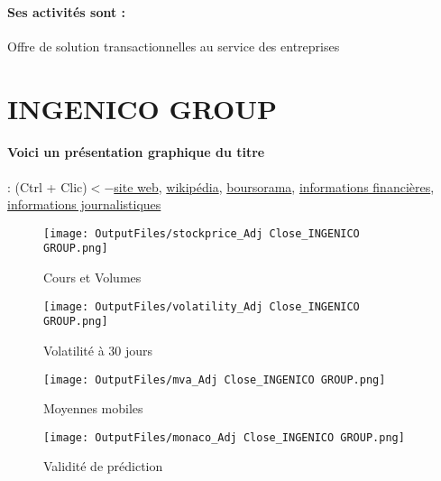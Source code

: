 \documentclass[11pt,a4paper]{report}%
\begin{document}
\paragraph{Ses activités sont : } Offre de solution transactionnelles au service des entreprises 
    
    \newpage

\section{INGENICO GROUP}

\paragraph{Voici un présentation graphique du titre} : (Ctrl + Clic)$<-$\href{https://www.ingenico.com/fr/presse-et-publications/documentation-financiere}{site web}, \href{https://fr.wikipedia.org/wiki/Ingenico}{wikipédia}, \href{https://www.boursorama.com/cours/1rPING}{boursorama}, \href{https://www.qwant.com/?q=site:https:%2f%2fwww.easybourse.com%2faction-societe%2fINGENICO-GROUP&t=web&client=ext-firefox-hp}{informations financières}, \href{https://bourse.lerevenu.com/cours-de-bourse/fiche-valeur-synthese/INGENICO-GROUP/ING-FR}{informations journalistiques}
\begin{figure}[!htb]
   \begin{minipage}{0.5\textwidth}
     \centering
     \texttt{[image: OutputFiles/stockprice\_Adj Close\_INGENICO GROUP.png]}
     \caption{Cours et Volumes}\label{Fig:price_INGENICO GROUP}
   \end{minipage}\hfill
   \begin{minipage}{0.5\textwidth}
     \centering
     \texttt{[image: OutputFiles/volatility\_Adj Close\_INGENICO GROUP.png]}
     \caption{Volatilité à 30 jours}\label{Fig:volat_INGENICO GROUP}
   \end{minipage}
\end{figure}
\begin{figure}[!htb]
   \begin{minipage}{0.5\textwidth}
     \centering
     \texttt{[image: OutputFiles/mva\_Adj Close\_INGENICO GROUP.png]}
     \caption{Moyennes mobiles}\label{Fig:mva_INGENICO GROUP}
   \end{minipage}\hfill
   \begin{minipage}{0.5\textwidth}
     \centering
     \texttt{[image: OutputFiles/monaco\_Adj Close\_INGENICO GROUP.png]}
     \caption{Validité de prédiction}\label{Fig:prediction_INGENICO GROUP}
   \end{minipage}
\end{figure}
\end{document}
